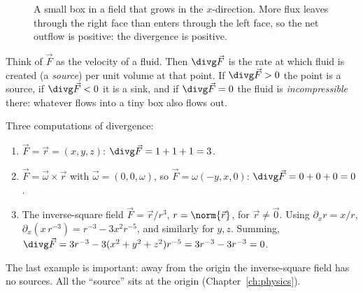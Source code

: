 \begin{figure}[ht]
\centering
{}
\caption{A small box in a field that grows in the $x$-direction. More flux leaves through the right face than enters through the left face, so the net outflow is positive: the divergence is positive.}
\label{fig:divbox}
\end{figure}

\begin{intuition}
Think of $\vec F$ as the velocity of a fluid. Then $\divg\vec F$ is the rate at which fluid is created (a \emph{source}) per unit volume at that point. If $\divg\vec F>0$ the point is a source, if $\divg\vec F<0$ it is a sink, and if $\divg\vec F=0$ the fluid is \emph{incompressible} there: whatever flows into a tiny box also flows out.
\end{intuition}

\begin{example}
Three computations of divergence:
\begin{enumerate}[label=(\alph*)]
  \item $\vec F=\vec r=(x,y,z)$: $\divg\vec F=1+1+1=3$.
  \item $\vec F=\vec\omega\times\vec r$ with $\vec\omega=(0,0,\omega)$, so $\vec F=\omega(-y,x,0)$: $\divg\vec F=0+0+0=0$.
  \item The inverse-square field $\vec F=\vec r/r^3$, $r=\norm{\vec r}$, for $\vec r\ne\vec 0$. Using $\partial_xr=x/r$, $\partial_x(x\,r^{-3})=r^{-3}-3x^2r^{-5}$, and similarly for $y,z$. Summing, $\divg\vec F=3r^{-3}-3(x^2+y^2+z^2)r^{-5}=3r^{-3}-3r^{-3}=0$.
\end{enumerate}
The last example is important: away from the origin the inverse-square field has no sources. All the ``source'' sits at the origin (Chapter~\ref{ch:physics}).
\end{example}

